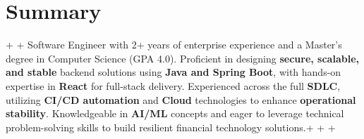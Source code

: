 \documentclass[letterpaper,10pt]{article}                                                                                                                                                                                                                                                                                                                                                                                                                                                                                                                                                                         +
\begin{document}
 \section{Summary}                                                                                                                                                                                                                                                                                                                                                                                                                                                                                                                                                                                                 +
                                                                                                                                                                                                                                                                                                                                                                                                                                                                                                                                                                                                                   +
 Software Engineer with 2+ years of enterprise experience and a Master’s degree in Computer Science (GPA 4.0). Proficient in designing \textbf{secure, scalable, and stable} backend solutions using \textbf{Java and Spring Boot}, with hands-on expertise in \textbf{React} for full-stack delivery. Experienced across the full \textbf{SDLC}, utilizing \textbf{CI/CD automation} and \textbf{Cloud} technologies to enhance \textbf{operational stability}. Knowledgeable in \textbf{AI/ML} concepts and eager to leverage technical problem-solving skills to build resilient financial technology solutions.+
                                                                                                                                                                                                                                                                                                                                                                                                                                                                                                                                                                                                                   +
                                                                                                                                                                                                                                                                                                                                                                                                                                                                                                                                                                                                                   +
\end{document}
